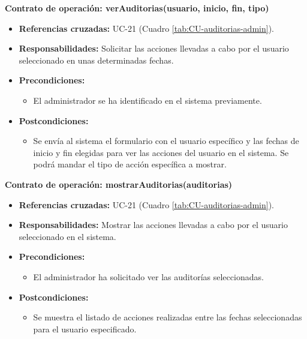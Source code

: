 \textbf{Contrato de operación: verAuditorias(usuario, inicio, fin, tipo)}
\begin{itemize}
\item \textbf{Referencias cruzadas:} UC-21 (Cuadro \ref{tab:CU-auditorias-admin}).
\item \textbf{Responsabilidades:} Solicitar las acciones llevadas a cabo por el usuario seleccionado en unas determinadas fechas.
\item \textbf{Precondiciones:} 
 \begin{itemize}
\item El administrador se ha identificado en el sistema previamente.
\end {itemize}
\item \textbf{Postcondiciones:} 
 \begin{itemize}
\item Se envía al sistema el formulario con el usuario específico y las fechas de inicio y fin elegidas para ver las acciones del usuario en el sistema. Se podrá mandar el tipo de acción específica a mostrar.
\end {itemize}
\end {itemize}

\textbf{Contrato de operación: mostrarAuditorias(auditorias)}
\begin{itemize}
\item \textbf{Referencias cruzadas:} UC-21 (Cuadro \ref{tab:CU-auditorias-admin}).
\item \textbf{Responsabilidades:} Mostrar las acciones llevadas a cabo por el usuario seleccionado en el sistema.
\item \textbf{Precondiciones:} 
 \begin{itemize}
\item El administrador ha solicitado ver las auditorías seleccionadas.
\end {itemize}
\item \textbf{Postcondiciones:} 
 \begin{itemize}
\item Se muestra el listado de acciones realizadas entre las fechas seleccionadas para el usuario especificado.
\end {itemize}
\end {itemize}

\vspace{10mm}


